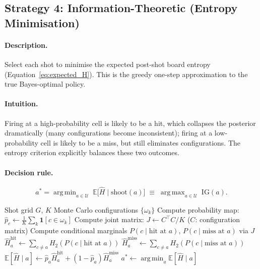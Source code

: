 \documentclass[12pt,a4paper]{article}
\DeclareMathOperator*{\argmin}{arg\,min}
\DeclareMathOperator*{\argmax}{arg\,max}
\newcommand{\E}{\mathbb{E}}
\newcommand{\1}{\mathbf{1}}
\newcommand{\Hb}{H_2}
\begin{document}
\subsection{Strategy 4: Information-Theoretic (Entropy Minimisation)}
\label{sec:entropy}

\paragraph{Description.}
Select each shot to minimise the expected post-shot board entropy
(Equation~\ref{eq:expected_H}).  This is the greedy one-step approximation to
the true Bayes-optimal policy.

\paragraph{Intuition.}
Firing at a high-probability cell is likely to be a hit, which collapses the
posterior dramatically (many configurations become inconsistent); firing at a
low-probability cell is likely to be a miss, but still eliminates configurations.
The entropy criterion explicitly balances these two outcomes.

\paragraph{Decision rule.}
\begin{equation}
  a^* = \argmin_{a \in \mathcal{U}}\;
  \E\bigl[\hat{H} \mid \text{shoot}(a)\bigr]
  \;\equiv\;
  \argmax_{a \in \mathcal{U}}\; \mathrm{IG}(a).
\end{equation}

\begin{algorithm}[H]
  \caption{Entropy Minimisation Strategy}
  \begin{algorithmic}[1]
    \Require Shot grid $G$, $K$ Monte Carlo configurations $\{\omega_k\}$
    \State Compute probability map: $\hat{p}_c \gets \frac{1}{K}\sum_k \1[c \in \omega_k]$
    \State Compute joint matrix: $J \gets C^\top C / K$ \quad ($C$: configuration matrix)
      \State Compute conditional marginals $P(c \mid \text{hit at }a)$,
             $P(c \mid \text{miss at }a)$ via $J$
      \State $\hat{H}_a^{\text{hit}} \gets \sum_{c \neq a} \Hb(P(c \mid \text{hit at }a))$
      \State $\hat{H}_a^{\text{miss}} \gets \sum_{c \neq a} \Hb(P(c \mid \text{miss at }a))$
      \State $\E[\hat{H} \mid a] \gets \hat{p}_a \hat{H}_a^{\text{hit}} + (1-\hat{p}_a)\hat{H}_a^{\text{miss}}$
    \EndFor
    \State \Return $a^* \gets \argmin_a \E[\hat{H} \mid a]$
  \end{algorithmic}
\end{algorithm}
\end{document}
